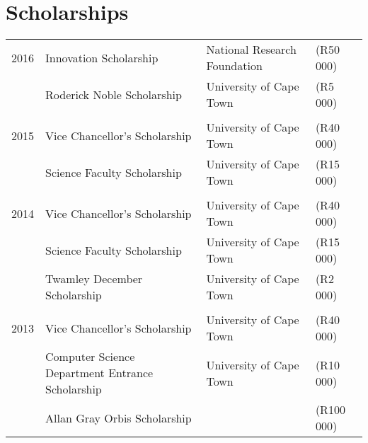 
\section{Scholarships}

\begin{tabular}{R{1cm}|lll}
2016 & Innovation Scholarship & National Research Foundation&\footnotesize(R50\,000)\normalsize\\
     &Roderick Noble Scholarship & University of Cape Town & \footnotesize(R5\,000)\normalsize\\
&&\\
2015 & Vice Chancellor's Scholarship & University of Cape Town &\footnotesize(R40\,000)\normalsize\\
& Science Faculty Scholarship & University of Cape Town &\footnotesize(R15\,000)\normalsize\\
&&\\
2014 & Vice Chancellor's Scholarship & University of Cape Town &\footnotesize(R40\,000)\normalsize\\
& Science Faculty Scholarship & University of Cape Town &\footnotesize(R15\,000)\normalsize\\
& Twamley December Scholarship & University of Cape Town &\footnotesize(R2\,000)\normalsize\\
&&\\
2013 & Vice Chancellor's Scholarship & University of Cape Town &\footnotesize(R40\,000)\normalsize\\
& Computer Science Department Entrance Scholarship & University of Cape Town &\footnotesize(R10\,000)\normalsize\\
& Allan Gray Orbis Scholarship &&\footnotesize(R100\,000)\normalsize\\
\end{tabular}

